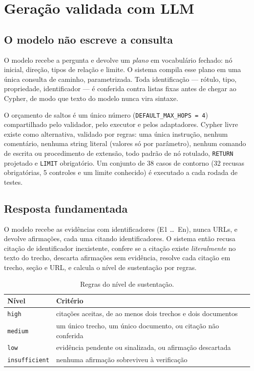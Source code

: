 \documentclass[12pt]{article}
\begin{document}
\section{Geração validada com LLM}

\subsection{O modelo não escreve a consulta}

O modelo recebe a pergunta e devolve um \emph{plano} em vocabulário fechado: nó inicial, direção,
tipos de relação e limite. O sistema compila esse plano em uma única consulta de caminho,
parametrizada. Toda identificação --- rótulo, tipo, propriedade, identificador --- é conferida
contra listas fixas antes de chegar ao Cypher, de modo que texto do modelo nunca vira sintaxe.

O orçamento de saltos é um único número (\texttt{DEFAULT\_MAX\_HOPS = 4}) compartilhado pelo
validador, pelo executor e pelos adaptadores. Cypher livre existe como alternativa, validado por
regras: uma única instrução, nenhum comentário, nenhuma string literal (valores só por parâmetro),
nenhum comando de escrita ou procedimento de extensão, todo padrão de nó rotulado,
\texttt{RETURN} projetado e \texttt{LIMIT} obrigatório. Um conjunto de 38 casos de contorno (32
recusas obrigatórias, 5 controles e um limite conhecido) é executado a cada rodada de testes.

\subsection{Resposta fundamentada}

O modelo recebe as evidências com identificadores (E1 \ldots\ En), nunca URLs, e devolve
afirmações, cada uma citando identificadores. O sistema então recusa citação de identificador
inexistente, confere se a citação existe \emph{literalmente} no texto do trecho, descarta
afirmações sem evidência, resolve cada citação em trecho, seção e URL, e calcula o nível de
sustentação por regras.

\begin{table}[h]
\centering
\caption{Regras do nível de sustentação.}
\label{tab:niveis}
\small
\begin{tabular}{@{}ll@{}}
\toprule
Nível & Critério \\
\midrule
\texttt{high} & citações aceitas, de ao menos dois trechos e dois documentos \\
\texttt{medium} & um único trecho, um único documento, ou citação não conferida \\
\texttt{low} & evidência pendente ou sinalizada, ou afirmação descartada \\
\texttt{insufficient} & nenhuma afirmação sobreviveu à verificação \\
\bottomrule
\end{tabular}
\end{table}
\end{document}

